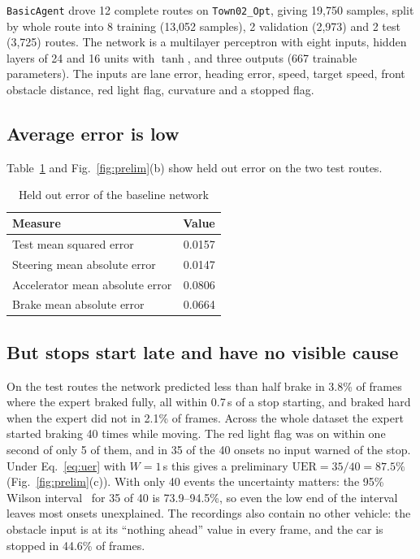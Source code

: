 \documentclass[conference]{IEEEtran}
\begin{document}
\texttt{BasicAgent} drove 12 complete routes on \texttt{Town02\_Opt},
giving 19{,}750 samples, split by whole route into 8 training (13{,}052
samples), 2 validation (2{,}973) and 2 test (3{,}725) routes. The
network is a multilayer perceptron with eight inputs, hidden layers of
24 and 16 units with $\tanh$, and three outputs (667 trainable
parameters). The inputs are lane
error, heading error, speed, target speed, front obstacle distance, red
light flag, curvature and a stopped flag.

\subsection{Average error is low}

Table~\ref{tab:base} and Fig.~\ref{fig:prelim}(b) show held out error on
the two test routes.

\begin{table}[htbp]
\caption{Held out error of the baseline network}
\label{tab:base}
\centering\footnotesize
\begin{tabular}{@{}lr@{}}
\toprule
Measure & Value \\
\midrule
Test mean squared error          & 0.0157 \\
Steering mean absolute error     & 0.0147 \\
Accelerator mean absolute error  & 0.0806 \\
Brake mean absolute error        & 0.0664 \\
\bottomrule
\end{tabular}
\end{table}

\subsection{But stops start late and have no visible cause}

On the test routes the network predicted less than half brake in 3.8\%
of frames where the expert braked fully, all within 0.7\,s of a stop
starting, and braked hard when the expert did not in 2.1\% of frames.
Across the whole dataset the expert started braking 40 times while
moving. The red light flag was on within one second of only 5 of them,
and in 35 of the 40 onsets no input warned of the stop. Under
Eq.~\eqref{eq:uer} with $W=1$\,s this gives a preliminary
$\mathrm{UER}=35/40=87.5\%$ (Fig.~\ref{fig:prelim}(c)). With only 40
events the uncertainty matters: the 95\% Wilson
interval~\cite{wilson,brown} for 35 of 40 is 73.9--94.5\%, so even the
low end of the interval leaves most onsets unexplained.
The recordings also contain no other
vehicle: the obstacle input is at its ``nothing ahead'' value in every
frame, and the car is stopped in 44.6\% of frames.
\end{document}
